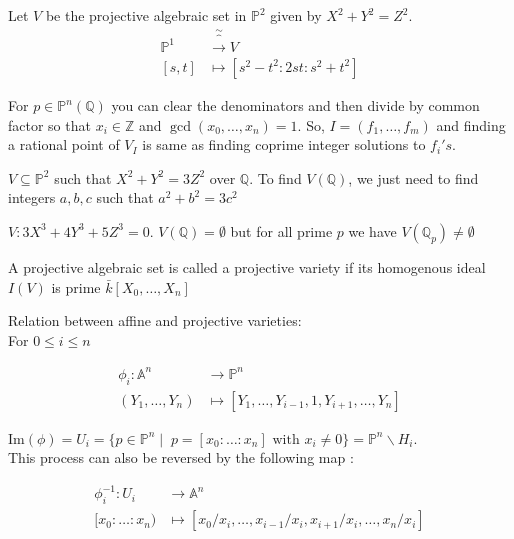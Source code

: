 \documentclass[oneside, 12pt, ]{scrbook}
\newcommand{\QQ}{\mathbb Q}
\newcommand{\ZZ}{\mathbb Z}
\theoremstyle{theorem}
\begin{document}
\begin{example}
Let $V$ be the projective algebraic set in $\mathbb{P}^2$ given by $X^2 + Y^2 = Z^2$. 
\begin{align*}
\mathbb{P}^1 & \overbrace{\rightarrow}^{\sim} V \\
[s,t] & \mapsto [s^2 - t^2 : 2st : s^2+t^2]
\end{align*}
\end{example}

\begin{remark}
For $p \in \mathbb{P}^n(\QQ)$ you can clear the denominators and then divide by common factor so that $x_{i} \in \ZZ$ and $\gcd(x_{0} , \hdots ,x_{n})=1$. So, $I =(f_{1}, \hdots , f_{m})$ and finding a rational point of $V_{I}$ is same as finding coprime integer solutions to $f_{i}'s$. 
\end{remark}

\begin{example}
$V \subseteq \mathbb{P}^2$ such that $X^2 + Y^2 = 3Z^2$ over $\QQ$. To find $V(\QQ)$, we just need to find integers $a,b,c$ such that $a^2 +b^2 = 3c^2$
\end{example}

\begin{example}
$V : 3X^3 + 4Y^3 + 5Z^3 = 0$. $V(\QQ) = \emptyset$ but for all prime $p$ we have $V(\QQ_{p}) \neq \emptyset$
\end{example}

\begin{definition}
A projective algebraic set is called a projective variety if its homogenous ideal $I(V)$ is prime $\bar{k}[X_{0}, \hdots , X_{n}]$
\end{definition}

Relation between affine and projective varieties: \\

For $ 0 \le i \le n$
\begin{center}
\begin{align*}
\phi_{i}: \mathbb{A}^n &\rightarrow \mathbb{P}^n \\
(Y_{1}, \hdots , Y_{n}) &\mapsto [Y_{1}, \hdots , Y_{i-1}, 1, Y_{i+1} , \hdots , Y_{n}]
\end{align*}
\end{center}
$\mathrm{Im}(\phi) = U_{i} = \{p \in \mathbb{P}^n \mid \; p =[x_{0}: \hdots  : x_{n}] \text{ with } x_{i} \neq 0\} = \mathbb{P}^n \backslash H_{i}$. \\
This process can also be reversed by the following map : 
\begin{center}
\begin{align*}
\phi_{i}^{-1}: U_{i} &\rightarrow \mathbb{A}^n \\
[x_{0}: \hdots : x_{n}) &\mapsto [x_{0}/x_{i}, \hdots , x_{i-1}/x_{i}, x_{i+1}/x_{i} , \hdots , x_{n}/x_{i}]
\end{align*}
\end{center}
\end{document}
